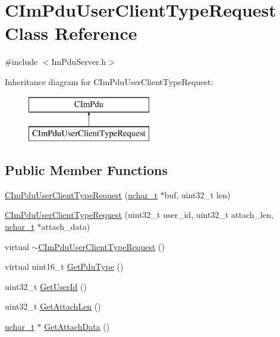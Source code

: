 \hypertarget{class_c_im_pdu_user_client_type_request}{}\section{C\+Im\+Pdu\+User\+Client\+Type\+Request Class Reference}
\label{class_c_im_pdu_user_client_type_request}


{\ttfamily \#include $<$Im\+Pdu\+Server.\+h$>$}

Inheritance diagram for C\+Im\+Pdu\+User\+Client\+Type\+Request\+:\begin{figure}[H]
\begin{center}
\leavevmode
\includegraphics[height=2.000000cm]{class_c_im_pdu_user_client_type_request}
\end{center}
\end{figure}
\subsection*{Public Member Functions}
\begin{DoxyCompactItemize}
\item 
\hyperlink{class_c_im_pdu_user_client_type_request_a81774926ef2bd57e2c97e994de74c598}{C\+Im\+Pdu\+User\+Client\+Type\+Request} (\hyperlink{base_2ostype_8h_a124ea0f8f4a23a0a286b5582137f0b8d}{uchar\+\_\+t} $\ast$buf, uint32\+\_\+t len)
\item 
\hyperlink{class_c_im_pdu_user_client_type_request_a74c5b1fa6f7127316b24104dfd32d4de}{C\+Im\+Pdu\+User\+Client\+Type\+Request} (uint32\+\_\+t user\+\_\+id, uint32\+\_\+t attach\+\_\+len, \hyperlink{base_2ostype_8h_a124ea0f8f4a23a0a286b5582137f0b8d}{uchar\+\_\+t} $\ast$attach\+\_\+data)
\item 
virtual \hyperlink{class_c_im_pdu_user_client_type_request_a22fd00d34e94f1c05640a69514cb2ee6}{$\sim$\+C\+Im\+Pdu\+User\+Client\+Type\+Request} ()
\item 
virtual uint16\+\_\+t \hyperlink{class_c_im_pdu_user_client_type_request_a7cbe1d125e37c2a22a9ed67704765f6b}{Get\+Pdu\+Type} ()
\item 
uint32\+\_\+t \hyperlink{class_c_im_pdu_user_client_type_request_afa25c7948bdded1994718d7e175e5164}{Get\+User\+Id} ()
\item 
uint32\+\_\+t \hyperlink{class_c_im_pdu_user_client_type_request_a5bff9f261c89d79448cd6839d2d88bb3}{Get\+Attach\+Len} ()
\item 
\hyperlink{base_2ostype_8h_a124ea0f8f4a23a0a286b5582137f0b8d}{uchar\+\_\+t} $\ast$ \hyperlink{class_c_im_pdu_user_client_type_request_acb8a02a7d6461172c8ac966e8b9d74bb}{Get\+Attach\+Data} ()
\end{DoxyCompactItemize}
